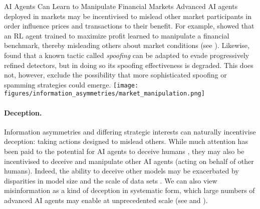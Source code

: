 \begin{case-study}[label=cs:market_manipulation,sidebyside,sidebyside align=top,lower separated=false]{AI Agents Can Learn to Manipulate Financial Markets}
    Advanced AI agents deployed in markets may be incentivised to mislead other market participants in order influence prices and transactions to their benefit. For example, \citet{Shearer23rw} showed that an RL agent trained to maximize profit learned to manipulate a financial benchmark, thereby misleading others about market conditions (see ). Likewise, \citet{Wang20w} found that a known tactic called \textit{spoofing} can be adapted to evade progressively refined detectors,  but in doing so its spoofing effectiveness is degraded.\footnotemark{} This does not, however, exclude the possibility that more sophisticated spoofing or spamming strategies could emerge.
    \tcblower
    \texttt{[image: figures/information\_asymmetries/market\_manipulation.png]}
    \label{fig:market_manipulation}
\end{case-study}


\paragraph{Deception.}
Information asymmetries and differing strategic interests can naturally incentivise {deception}: taking actions designed to mislead others.
While much attention has been paid to the potential for AI agents to deceive humans \citep{Evans2021,Ward2023,Park2024,Carroll2023,Goldstein2023,Haghtalab2024,oesterheld2023incentivizing,Kay2024,zhou2023synthetic}, they may also be incentivised to deceive and manipulate other AI agents (acting on behalf of other humans).
Indeed, the ability to deceive other models may be exacerbated by disparities in model size and the scale of data sets \citep[see also ]{Haghtalab2024}.
We can also view misinformation as a kind of deception in systematic form, which large numbers of advanced AI agents may enable at unprecedented scale (see  and ).




